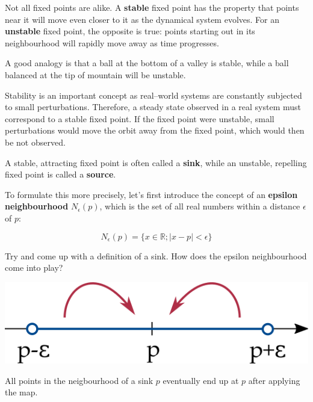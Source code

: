 \pagebreak


Not all fixed points are alike. A \textbf{stable} fixed point has the property that points near it will move even closer to it as the dynamical system evolves. For an \textbf{unstable} fixed point, the opposite is true: points starting out in its neighbourhood will rapidly move away as time progresses.

A good analogy is that a ball at the bottom of a valley is stable, while a ball balanced at the tip of mountain will be unstable.

Stability is an important concept as real--world systems are constantly subjected to small perturbations. Therefore, a steady state observed in a real system must correspond to a stable fixed point. If the fixed point were unstable, small perturbations would move the orbit away from the fixed point, which would then be not observed.

A stable, attracting fixed point is often called a \textbf{sink}, while an unstable, repelling fixed point is called a \textbf{source}.

To formulate this more precisely, let's first introduce the concept of an \textbf{epsilon neighbourhood} $N_\epsilon(p)$, which is the set of all real numbers within a distance $\epsilon$ of $p$:

\begin{equation}
N_\epsilon(p) = \{x \in \mathbb{R} ; |x-p| < \epsilon\}
\end{equation} 

\begin{cue}
Try and come up with a definition of a sink. How does the epsilon neighbourhood come into play? 
\end{cue}

\begin{marginfigure}
\centering
\includegraphics{dynamic/figures/sink}
\caption{All points in the neigbourhood of a sink $p$ eventually end up at $p$ after applying the map.}
\label{fig-sink}
\end{marginfigure}

